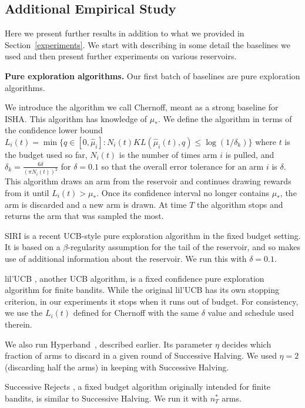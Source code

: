 \subsection {Additional Empirical Study}\label{appendix:experiments}

Here we present further results in addition to what we provided in Section~\ref{experiments}. We start with describing in some detail the baselines we used and then present further experiments on various reservoirs.

\textbf{Pure exploration algorithms.}
Our first batch of baselines are pure exploration algorithms.

We introduce the algorithm we call Chernoff, meant as a strong baseline
for ISHA. This algorithm has knowledge of $\mu_*$.
We define the algorithm in terms of the confidence lower bound $L_i(t) = \min \{q \in [0,\widehat{\mu}_{i}] : N_i(t) KL(\hat{\mu}_i(t),q) \le \log(1/\delta_k) \}\label{kl-ub}$
where $t$ is the budget used so far,
$N_i(t)$ is the number of times arm $i$ is pulled,
and $\delta_k = \frac{6\delta}{(\pi N_i(t))^2}$ for $\delta=0.1$ so that the overall error tolerance for an arm $i$ is $\delta$.
This algorithm draws an arm from the reservoir and continues drawing
rewards from it until $L_i(t) > \mu_*$. Once its confidence interval no longer contains $\mu_*$, the arm is discarded and a new arm is drawn.
At time $T$ the algorithm stops and returns the arm that was sampled the most. 

SIRI \citep{DBLP:journals/corr/CarpentierV15} is a recent UCB-style pure exploration algorithm in the fixed budget setting.
It is based on a $\beta$-regularity assumption for the tail of the
reservoir, and so makes use of additional information about the reservoir.
We run this with $\delta=0.1$.

lil'UCB \citep{Jamieson2014lilU}, another UCB algorithm, is a fixed confidence pure exploration algorithm for finite bandits. While the original lil'UCB has its own stopping criterion, in our experiments it stops when it runs out of budget. For consistency, we use the $L_i(t)$ defined for Chernoff with the same $\delta$ value and schedule used therein.

We also run Hyperband~\citep{li2017hyperband}, described earlier.
Its parameter $\eta$ decides which fraction of arms to discard in a given round of Successive Halving. We used $\eta=2$ (discarding half the arms) in keeping with Successive Halving.

Successive Rejects \citep{DBLP:conf/colt/AudibertBM10}, a fixed budget algorithm originally intended for finite bandits, is similar to Successive Halving. We run it with $n^*_T$ arms. 

